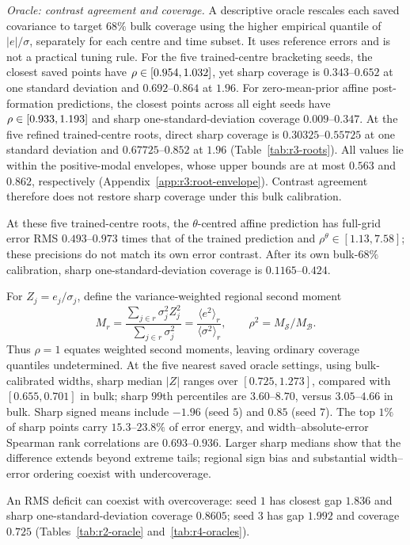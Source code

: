 \emph{Oracle: contrast agreement and coverage.}
A descriptive oracle rescales each saved covariance to target $68\%$ bulk coverage using the
higher empirical quantile of $|e|/\sigma$, separately for each centre and time subset.
It uses reference errors and is not a practical tuning rule. For the five trained-centre
bracketing seeds, the closest saved points have $\rho\in[0.954,1.032]$, yet sharp
coverage is $0.343$--$0.652$ at one standard deviation and $0.692$--$0.864$ at $1.96$.
For zero-mean-prior affine post-formation predictions, the closest points across all eight seeds have
$\rho\in[0.933,1.193]$ and sharp one-standard-deviation coverage $0.009$--$0.347$.
At the five refined trained-centre roots, direct sharp coverage is
$0.30325$--$0.55725$ at one standard deviation and $0.67725$--$0.852$ at $1.96$
(Table~\ref{tab:r3-roots}). All values lie within the positive-modal envelopes,
whose upper bounds are at most $0.563$ and $0.862$, respectively
(Appendix~\ref{app:r3:root-envelope}). Contrast agreement therefore does not
restore sharp coverage under this bulk calibration.

At these five trained-centre roots, the $\theta$-centred affine prediction has
full-grid error RMS $0.493$--$0.973$ times that of the trained prediction and
$\rho^\theta\in[1.13,7.58]$; these precisions do not match its own error contrast.
After its own bulk-$68\%$ calibration, sharp one-standard-deviation coverage is
$0.1165$--$0.424$.

For $Z_j=e_j/\sigma_j$, define the variance-weighted regional second moment
\[
 M_r=\frac{\sum_{j\in r}\sigma_j^2Z_j^2}{\sum_{j\in r}\sigma_j^2}
     =\frac{\langle e^2\rangle_r}{\langle\sigma^2\rangle_r},\qquad
 \rho^2=M_{\mathcal S}/M_{\mathcal B}.
\]
Thus $\rho=1$ equates weighted second moments, leaving ordinary coverage quantiles
undetermined. At the five nearest saved oracle settings, using bulk-calibrated widths,
sharp median $|Z|$ ranges
over $[0.725,1.273]$, compared with $[0.655,0.701]$ in bulk; sharp $99$th percentiles
are $3.60$--$8.70$, versus $3.05$--$4.66$ in bulk. Sharp signed means include
$-1.96$ (seed $5$) and $0.85$ (seed $7$). The top $1\%$ of sharp points carry $15.3$--$23.8\%$ of error
energy, and width--absolute-error Spearman rank correlations are $0.693$--$0.936$.
Larger sharp medians show that the difference extends beyond extreme tails;
regional sign bias and substantial width--error ordering coexist with undercoverage.

An RMS deficit can coexist with overcoverage: seed $1$ has closest gap $1.836$
and sharp one-standard-deviation coverage $0.8605$; seed $3$ has gap $1.992$
and coverage $0.725$ (Tables~\ref{tab:r2-oracle} and~\ref{tab:r4-oracles}).

